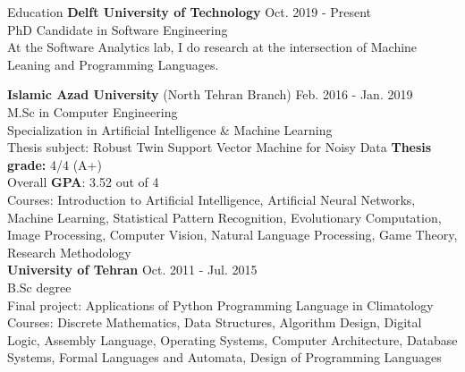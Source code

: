 \documentclass{resume} %
\begin{document}
\begin{rSection}{Education}
{\bf Delft University of Technology} \hfill {Oct. 2019 - Present} \\
PhD Candidate in Software Engineering \\
At the Software Analytics lab, I do research at the intersection of Machine Leaning and Programming Languages.

{\bf Islamic Azad University} (North Tehran Branch) \hfill {Feb. 2016 - Jan. 2019} \\ 
M.Sc in Computer Engineering  \\
Specialization in Artificial Intelligence \& Machine Learning  \smallskip \\
Thesis subject: Robust Twin Support Vector Machine for Noisy Data \hfill \textbf{Thesis grade:} 4/4 (A+)  \\
Overall \textbf{GPA}: 3.52 out of 4 \\
Courses: Introduction to Artificial Intelligence, Artificial Neural Networks, Machine Learning, Statistical Pattern Recognition, Evolutionary Computation, Image Processing, Computer Vision, Natural Language Processing, Game Theory, Research Methodology \\

{\bf University of Tehran} \hfill {Oct. 2011 - Jul. 2015} \\
B.Sc degree \\
Final project: Applications of Python Programming Language in Climatology \\ 
Courses: Discrete Mathematics, Data Structures, Algorithm Design, Digital Logic, Assembly Language, Operating Systems, Computer Architecture, Database Systems, Formal Languages and Automata, Design of Programming Languages
\end{rSection}

\end{document}
